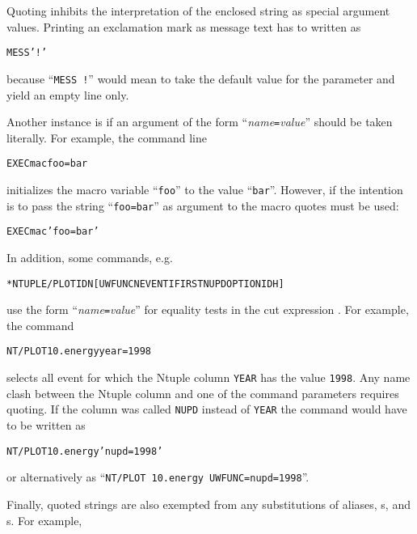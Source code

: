 Quoting inhibits the interpretation of the enclosed string as special argument
values. Printing an exclamation mark as message text has to written as

\begin{alltt}
MESS '!'
\end{alltt}

because ``\texttt{MESS !}'' would mean to take the default value for the 
parameter  and yield an empty line only.

Another instance is if an argument of the form ``\textsl{name\texttt{=}value}'' 
should be taken literally. For example, the command line

\begin{alltt}
EXEC mac foo=bar
\end{alltt}

initializes the macro variable ``\texttt{foo}'' to the value ``\texttt{bar}''. 
However, if the intention is to pass the string ``\texttt{foo=bar}'' as 
argument to the macro quotes must be used:

\begin{alltt}
EXEC mac 'foo=bar'
\end{alltt}

In addition, some commands, e.g.\

\begin{alltt}
 * NTUPLE/PLOT IDN [ UWFUNC NEVENT IFIRST NUPD OPTION IDH ]
\end{alltt}

use the form ``\textsl{name\texttt{=}value}'' for equality tests in the cut 
expression .  For example, the command

\begin{alltt}
NT/PLOT 10.energy year=1998
\end{alltt}

selects all event for which the Ntuple column \texttt{YEAR} has the value 
\texttt{1998}. Any name clash between the Ntuple column and one of the command
parameters requires quoting. If the column was called \texttt{NUPD} instead of
\texttt{YEAR} the command would have to be written as

\begin{alltt}
NT/PLOT 10.energy 'nupd=1998'
\end{alltt}

or alternatively as ``\texttt{NT/PLOT 10.energy UWFUNC=nupd=1998}''.

Finally, quoted strings are also exempted from any substitutions of aliases, 
s, and s. For example,

